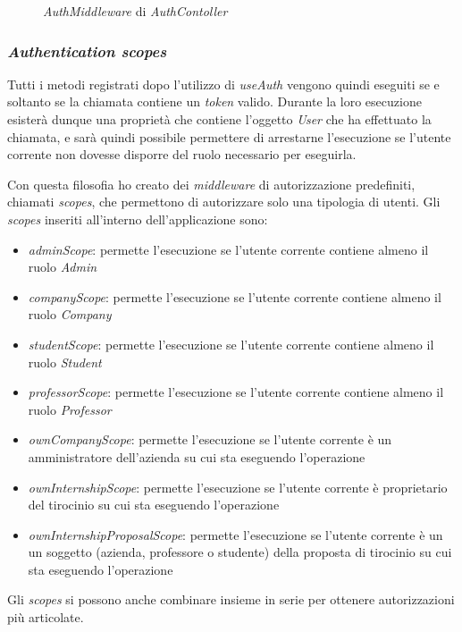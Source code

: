 \begin{figure}[H] 
	\centering    
	
	\caption[\textit{AuthMiddleware} di \textit{AuthContoller}]{\textit{AuthMiddleware} di \textit{AuthContoller}}
	\label{fig:server-auth-middleware}
\end{figure}

\subsubsection{\textit{Authentication scopes}}
\label{server:scopes}
Tutti i metodi registrati dopo l'utilizzo di \textit{useAuth} vengono quindi eseguiti se e soltanto se la chiamata contiene un \textit{token} valido. Durante la loro esecuzione esisterà dunque una proprietà che contiene l'oggetto \textit{User} che ha effettuato la chiamata, e sarà quindi possibile permettere di arrestarne l'esecuzione se l'utente corrente non dovesse disporre del ruolo necessario per eseguirla.

Con questa filosofia ho creato dei \textit{middleware} di autorizzazione predefiniti, chiamati \textit{scopes}, che permettono di autorizzare solo una tipologia di utenti. Gli \textit{scopes} inseriti all'interno dell'applicazione sono:
\begin{itemize}[itemsep=0pt]
	\item \textit{adminScope}: permette l'esecuzione se l'utente corrente contiene almeno il ruolo \textit{Admin}
	\item \textit{companyScope}: permette l'esecuzione se l'utente corrente contiene almeno il ruolo \textit{Company}
	\item \textit{studentScope}: permette l'esecuzione se l'utente corrente contiene almeno il ruolo \textit{Student}
	\item \textit{professorScope}: permette l'esecuzione se l'utente corrente contiene almeno il ruolo \textit{Professor}
	\item \textit{ownCompanyScope}: permette l'esecuzione se l'utente corrente è un amministratore dell'azienda su cui sta eseguendo l'operazione
	\item \textit{ownInternshipScope}: permette l'esecuzione se l'utente corrente è proprietario del tirocinio su cui sta eseguendo l'operazione
	\item \textit{ownInternshipProposalScope}: permette l'esecuzione se l'utente corrente è un un soggetto (azienda, professore o studente) della proposta di tirocinio su cui sta eseguendo l'operazione
\end{itemize}
Gli \textit{scopes} si possono anche combinare insieme in serie per ottenere autorizzazioni più articolate.

